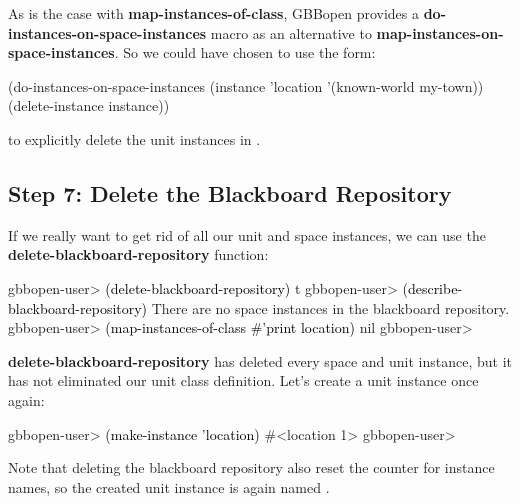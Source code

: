 \documentclass[10pt,twoside,english,pdftex]{article}
\begin{document}
%
As is the case with \textbf{map-instances-of-class}, GBBopen provides a
\textbf{do-instances-on-space-instances} macro as an alternative to
\textbf{map-instances-on-space-instances}.  So we could have chosen to use the
form:
%
\W\supp
\begin{example}
\textcolor{darkergray}{%
  (do-instances-on-space-instances (instance 'location '(known-world my-town))
    (delete-instance instance))}
\end{example}
%
to explicitly delete the  unit instances in .

\subsection*{Step 7: Delete the Blackboard Repository}

%
%
%
If we really want to get rid of all our unit and space instances, we can use
the \textbf{delete-blackboard-repository} function:
%
\W\supp
\begin{example}
\textcolor{darkergray}{%
  gbbopen-user> \textcolor{black}{(delete-blackboard-repository)}
  t
  gbbopen-user> \textcolor{black}{(describe-blackboard-repository)}
  There are no space instances in the blackboard repository.
  gbbopen-user> \textcolor{black}{(map-instances-of-class #'print location)}
  nil
  gbbopen-user>}
\end{example}

%
\textbf{delete-blackboard-repository} has deleted every space and unit
instance, but it has not eliminated our  unit class definition.
Let's create a  unit instance once again:
%
\W\supp
\begin{example}
\textcolor{darkergray}{%
  gbbopen-user> \textcolor{black}{(make-instance 'location)}
  #<location 1>
  gbbopen-user>}
\end{example}
%
Note that deleting the blackboard repository also reset the counter for
 instance names, so the created unit instance is again named
.


\T\markright{}%
\T\pagestyle{plain}
\T\cleardoublepage
\W{}
\T\pagestyle{fancy}
\T\thispagestyle{fancybottom}
\T\renewcommand{\headrulewidth}{0pt}
\end{document}
